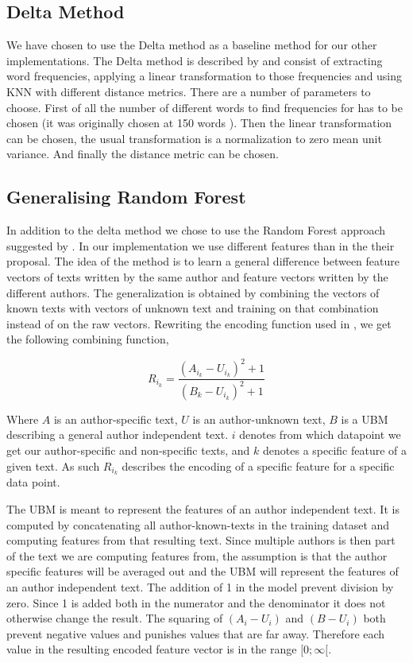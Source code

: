 \subsection{Delta Method} \label{subsec:method:delta_method}
We have chosen to use the Delta method as a baseline method for our other
implementations. The Delta method is described by \cite{evert2015towards} and
consist of extracting word frequencies, applying a linear transformation to
those frequencies and using \gls{KNN} with different distance metrics. There are
a number of parameters to choose. First of all the number of different words to
find frequencies for has to be chosen (it was originally chosen at 150 words
\cite{evert2015towards}). Then the linear transformation can be chosen, the
usual transformation is a normalization to zero mean unit variance. And finally
the distance metric can be chosen.

\subsection{Generalising Random Forest} \label{subsec:method:generalising_random_forest}
In addition to the delta method we chose to use the Random Forest approach
suggested by \cite{pacheco2015}. In our implementation we use different features
than in the their proposal. The idea of the method is to learn a general
difference between feature vectors of texts written by the same author and
feature vectors written by the different authors. The generalization is obtained
by combining the vectors of known texts with vectors of unknown text and
training on that combination instead of on the raw vectors. Rewriting the
encoding function used in \cite{pacheco2015}, we get the following combining
function,

\begin{equation}
    R_{i_k} = \frac{(A_{i_k}-U_{i_k})^2+1}{(B_k-U_{i_k})^2+1}
\end{equation}

Where $A$ is an author-specific text, $U$ is an author-unknown text, $B$ is a
\gls{UBM} describing a general author independent text. $i$ denotes from which
datapoint we get our author-specific and non-specific texts, and $k$ denotes a
specific feature of a given text. As such $R_{i_k}$ describes the encoding of a
specific feature for a specific data point.

The \gls{UBM} is meant to represent the features of an author independent
text. It is computed by concatenating all author-known-texts in the training
dataset and computing features from that resulting text. Since multiple authors
is then part of the text we are computing features from, the assumption is
that the author specific features will be averaged out and the \gls{UBM} will
represent the features of an author independent text. The addition of 1 in the
model prevent division by zero. Since 1 is added both in the numerator and the
denominator it does not otherwise change the result. The squaring of $(A_i -
U_i)$ and $(B - U_i)$ both prevent negative values and punishes values that are
far away. Therefore each value in the resulting encoded feature vector is in the
range $[0; \infty[$.

